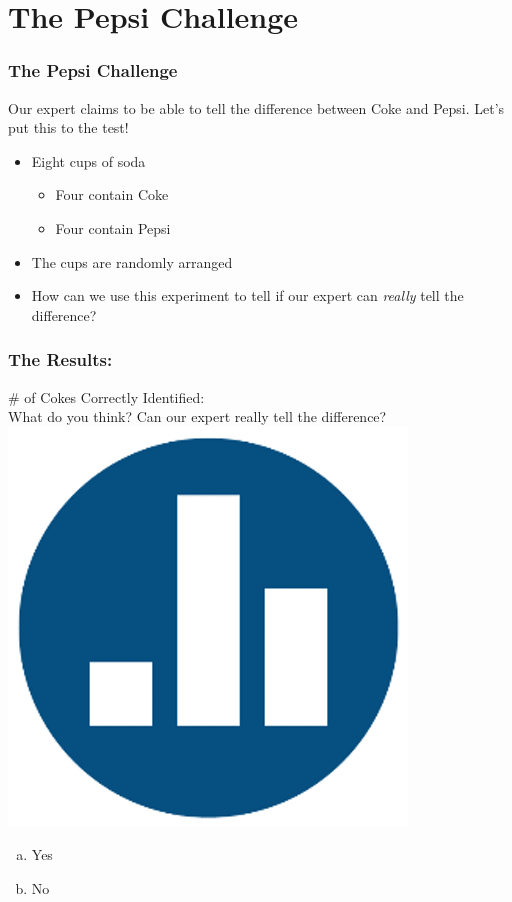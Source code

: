 \section{The Pepsi Challenge}
\begin{frame}
\frametitle{The Pepsi Challenge}
Our expert claims to be able to tell the difference between Coke and Pepsi. Let's put this to the test! 
\begin{itemize}
\item Eight cups of soda 
	\begin{itemize}
\item Four contain Coke 
\item Four contain Pepsi 
\end{itemize}
	\item The cups are randomly arranged 
	\item How can we use this experiment to tell if our expert can \emph{\alert{really}} tell the difference?
\end{itemize}
\end{frame}
\begin{frame}
\frametitle{The Results:}
	\# of Cokes Correctly Identified: \\ \vspace{2em}
	\alert{What do you think? Can our expert really tell the difference? \includegraphics[scale = 0.05]{./images/clicker}}
		\begin{enumerate}[(a)]
\item Yes
\item No
\end{enumerate}
\end{frame}

